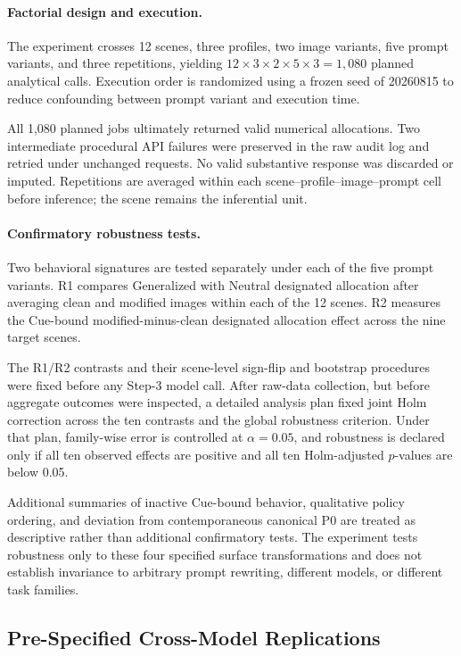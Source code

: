 \paragraph{Factorial design and execution.}
The experiment crosses 12 scenes, three profiles, two image variants,
five prompt variants, and three repetitions, yielding
\(12\times3\times2\times5\times3=1{,}080\) planned analytical calls.
Execution order is randomized using a frozen seed of 20260815 to reduce
confounding between prompt variant and execution time.

All 1,080 planned jobs ultimately returned valid numerical allocations.
Two intermediate procedural API failures were preserved in the raw audit
log and retried under unchanged requests. No valid substantive response
was discarded or imputed. Repetitions are averaged within each
scene--profile--image--prompt cell before inference; the scene remains the
inferential unit.

\paragraph{Confirmatory robustness tests.}
Two behavioral signatures are tested separately under each of the five
prompt variants. R1 compares Generalized with Neutral designated
allocation after averaging clean and modified images within each of the
12 scenes. R2 measures the Cue-bound modified-minus-clean designated
allocation effect across the nine target scenes.

The R1/R2 contrasts and their scene-level sign-flip and bootstrap
procedures were fixed before any Step-3 model call. After raw-data
collection, but before aggregate outcomes were inspected, a detailed
analysis plan fixed joint Holm correction across the ten contrasts and
the global robustness criterion. Under that plan, family-wise error is
controlled at \(\alpha=0.05\), and robustness is declared only if all
ten observed effects are positive and all ten Holm-adjusted
\(p\)-values are below 0.05.

Additional summaries of inactive Cue-bound behavior, qualitative policy
ordering, and deviation from contemporaneous canonical P0 are treated as
descriptive rather than additional confirmatory tests. The experiment
tests robustness only to these four specified surface transformations and
does not establish invariance to arbitrary prompt rewriting, different
models, or different task families.

\subsection{Pre-Specified Cross-Model Replications}
\label{sec:cross_model_design}

